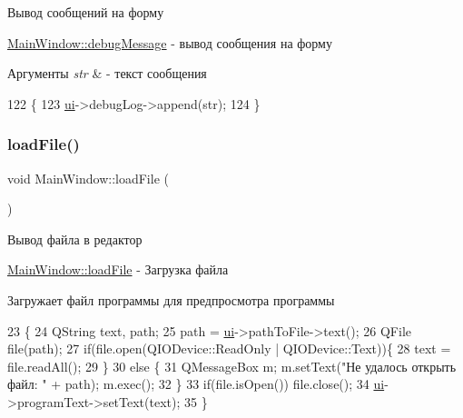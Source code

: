 Вывод сообщений на форму 

\hyperlink{class_main_window_ac29732293ed85bb092764df7b93fefbc}{Main\+Window\+::debug\+Message} -\/ вывод сообщения на форму


\begin{DoxyParams}{Аргументы}
{\em str} & -\/ текст сообщения \\
\hline
\end{DoxyParams}

\begin{DoxyCode}
122 \{
123     \hyperlink{class_main_window_a35466a70ed47252a0191168126a352a5}{ui}->debugLog->append(str);
124 \}
\end{DoxyCode}
\hypertarget{class_main_window_abc114bfc2f3b523486d89887e7877aea}{}\label{class_main_window_abc114bfc2f3b523486d89887e7877aea} 
\subsubsection{\texorpdfstring{load\+File()}{loadFile()}}
{\footnotesize\ttfamily void Main\+Window\+::load\+File (\begin{DoxyParamCaption}{ }\end{DoxyParamCaption})\hspace{0.3cm}{\ttfamily [private]}}



Вывод файла в редактор 

\hyperlink{class_main_window_abc114bfc2f3b523486d89887e7877aea}{Main\+Window\+::load\+File} -\/ Загрузка файла

Загружает файл программы для предпросмотра программы 
\begin{DoxyCode}
23 \{
24     QString text, path;
25     path = \hyperlink{class_main_window_a35466a70ed47252a0191168126a352a5}{ui}->pathToFile->text();
26     QFile file(path);
27     \textcolor{keywordflow}{if}(file.open(QIODevice::ReadOnly | QIODevice::Text))\{
28         text = file.readAll();
29     \}
30     \textcolor{keywordflow}{else} \{
31         QMessageBox m; m.setText(\textcolor{stringliteral}{"Не удалось открыть файл: "} + path); m.exec();
32     \}
33     \textcolor{keywordflow}{if}(file.isOpen()) file.close();
34     \hyperlink{class_main_window_a35466a70ed47252a0191168126a352a5}{ui}->programText->setText(text);
35 \}
\end{DoxyCode}
\hypertarget{class_main_window_ad157e69c40c80314586029f2a7c5e549}{}\label{class_main_window_ad157e69c40c80314586029f2a7c5e549} 

